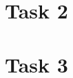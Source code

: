 \documentclass{article}
\begin{document}
\section{Task 2}

\subsection{}

\subsection{}

\subsection{}

\subsection{}

\section{Task 3}

\subsection{}

\subsection{}

\subsection{}
\end{document}
